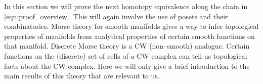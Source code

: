 \documentclass[class=article, crop=false]{standalone}
\begin{document}
In this section we will prove the next homotopy equivalence along the chain in \eqref{eqn:proof_overview}. This will again involve the use of posets and their combinatorics.
Morse theory for smooth manifolds gives a way to infer topological properties of manifolds from analytical properties of certain smooth functions on that manifold. Discrete Morse theory is a CW (non--smooth) analogue. Certain functions on the (discrete) set of cells of a CW complex can tell us topological facts about the CW complex. Here we will only give a brief introduction to the main results of this theory that are relevant to us.
\end{document}
